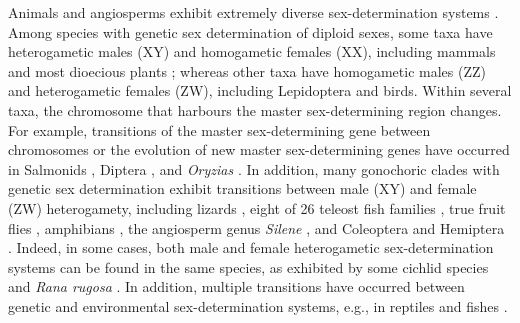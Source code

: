 \documentclass[12pt]{article}
\begin{document}
Animals and angiosperms exhibit extremely diverse sex-determination systems \citep[reviewed in][]{Bull:1983vi,Charlesworth:2010it,Beukeboom:2014vb,Bachtrog:2014bx}. 
Among species with genetic sex determination of diploid sexes, some taxa have heterogametic males (XY) and homogametic females (XX), including %
mammals and most dioecious plants \citep{Ming:2011iy}; whereas other taxa have homogametic males (ZZ) and heterogametic females (ZW), including Lepidoptera and birds. 
Within several taxa, the chromosome that harbours the master sex-determining region changes. 
For example, transitions of the master sex-determining gene between chromosomes or the evolution of new master sex-determining genes have occurred in Salmonids \citep{Li:2011fm,Yano:2012di}, Diptera \citep{Vicoso:2015hf}, and \textit{Oryzias} \citep{Myosho:2012fv}.
In addition, many gonochoric clades with genetic sex determination exhibit transitions between male (XY) and female (ZW) heterogamety, including lizards \citep{Ezaz:2009tk}, eight of 26 teleost fish families \citep{Mank:2006bt}, true fruit flies \citep[Tephritids,][]{Vicoso:2015hf}, amphibians \citep{Hillis:1990gu}, the angiosperm genus \textit{Silene} \citep{Slancarova:2013dq}, and Coleoptera and Hemiptera \citep[][plate 2]{Beukeboom:2014vb}.
Indeed, in some cases, both male and female heterogametic sex-determination systems can be found in the same species, as exhibited by some cichlid species \citep{Ser:2010iq} and \textit{Rana rugosa} \citep{Ogata:2007jm}.
In addition, multiple transitions have occurred between genetic and environmental sex-determination systems, e.g., in reptiles and fishes \citep{Conover:1987in,Mank:2006bt,Pokorna:2009ui,Ezaz:2009tk,Pen:2010kk,Holleley:2015hc}.

\end{document}
